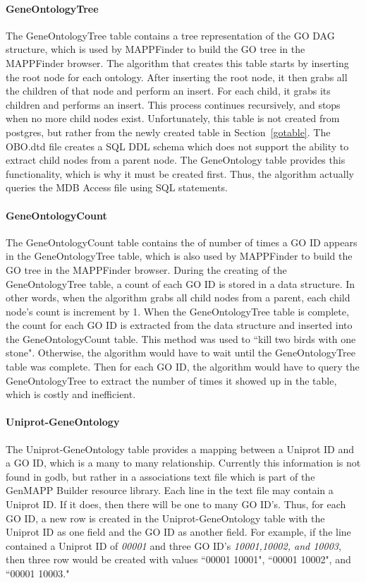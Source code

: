 \paragraph{GeneOntologyTree}
The GeneOntologyTree table contains a tree representation of the GO DAG structure, which is used by MAPPFinder
to build the GO tree in the MAPPFinder browser. The algorithm that creates this table starts by inserting the root
node for each ontology. After inserting the root node, it then grabs all the children of that node and perform an insert.
For each child, it grabs its children
and performs an insert. This process continues recursively, and stops when no more child nodes exist.
Unfortunately, this table is not created from postgres, but rather from the
newly created table in Section~\ref{gotable}. The OBO.dtd file creates a SQL DDL schema which does not support
the ability to extract child nodes from a parent node. The GeneOntology table provides this functionality, which
is why it must be created first. Thus, the algorithm actually queries the MDB Access file using SQL statements.


\paragraph{GeneOntologyCount}
The GeneOntologyCount table contains the of number of times a GO ID appears in the GeneOntologyTree table, which
is also used by MAPPFinder to build the GO tree in the MAPPFinder browser. During the creating of the GeneOntologyTree
table, a count of each GO ID is stored in a data structure. In other words, when the algorithm grabs all child nodes from
a parent, each child node's count is increment by 1. When the GeneOntologyTree table is complete, the count for
each GO ID is extracted from the data structure and inserted into the GeneOntologyCount table.
This method was used to ``kill two birds with one stone". Otherwise,
the algorithm would have to wait until the GeneOntologyTree table was complete. Then for each GO ID, the algorithm would have
to query the GeneOntologyTree to extract the number of times it showed up in the table, which is costly and inefficient.


\paragraph{Uniprot-GeneOntology}
The Uniprot-GeneOntology table provides a mapping between a Uniprot ID and a GO ID, which is a many to many relationship.
Currently this information is not found in godb, but rather in a associations text file which is part of the GenMAPP Builder
resource library. Each line in the text file may contain a Uniprot ID. If it does, then there will be one to many GO ID's.
Thus, for each GO ID, a new row is created in the Uniprot-GeneOntology table with the Uniprot ID as one field and the GO ID
as another field. For example, if the line contained a Uniprot ID of \emph{00001} and three GO ID's \emph{10001,10002, and 10003},
then three row would be created with values ``00001 10001", ``00001 10002", and ``00001 10003."


